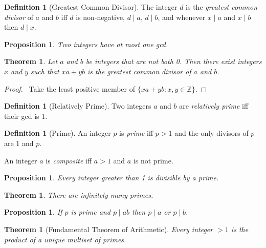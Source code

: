 \documentclass{article}
\let\qed\relax
\newtheorem{proposition}[axiom]{Proposition}
\newtheorem{theorem}[axiom]{Theorem}
\theoremstyle{definition}
\newtheorem{definition}[axiom]{Definition}
\begin{document}
    \begin{definition}[Greatest Common Divisor]
        The integer $d$ is the \emph{greatest common divisor} of $a$ and $b$ iff $d$ is non-negative,
        $d \mid a$, $d \mid b$,
        and whenever $x \mid a$ and $x \mid b$ then $d \mid x$.
    \end{definition}

    \begin{proposition}
        Two integers have at most one gcd.
    \end{proposition}

    \begin{theorem}
        Let $a$ and $b$ be integers that are not both 0. Then there exist integers $x$ and $y$ such that
        $xa + yb$ is the greatest common divisor of $a$ and $b$.
    \end{theorem}

    \begin{proof}
        \pf\ Take the least positive member of $\{ xa + yb : x,y \in \mathbb{Z} \}$. \qed
    \end{proof}

    \begin{definition}[Relatively Prime]
        Two integers $a$ and $b$ are \emph{relatively prime} iff their gcd is 1.
    \end{definition}

    \begin{definition}[Prime]
        An integer $p$ is \emph{prime} iff $p > 1$ and the only divisors of $p$ are 1 and $p$.
        
        An integer $a$ is \emph{composite} iff $a > 1$ and $a$ is not prime.
    \end{definition}

    \begin{proposition}
        Every integer greater than 1 is divisible by a prime.
    \end{proposition}

    \begin{theorem}
        There are infinitely many primes.
    \end{theorem}

    \begin{proposition}
        If $p$ is prime and $p \mid ab$ then $p \mid a$ or $p \mid b$.
    \end{proposition}

    \begin{theorem}[Fundamental Theorem of Arithmetic]
        Every integer $> 1$ is the product of a unique multiset of primes.
    \end{theorem}
\end{document}
